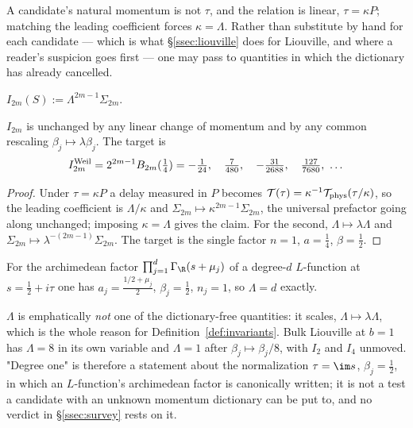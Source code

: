 A candidate's natural momentum is not $\tau$, and the relation is linear,
$\tau=\kappa P$; matching the leading coefficient forces $\kappa=\Lambda$. Rather
than substitute by hand for each candidate --- which is what \S\ref{ssec:liouville}
does for Liouville, and where a reader's suspicion goes first --- one may pass to
quantities in which the dictionary has already cancelled.

\begin{definition}\label{def:invariants}
$I_{2m}(S):=\Lambda^{2m-1}\Sigma_{2m}$.
\end{definition}

\begin{proposition}\label{prop:dictfree}
$I_{2m}$ is unchanged by any linear change of momentum and by any common
rescaling $\beta_j\mapsto\lambda\beta_j$. The target is
\[
 I_{2m}^{\rm Weil}=2^{2m-1}B_{2m}(\tfrac14)
 =-\tfrac1{24},\quad\tfrac7{480},\quad-\tfrac{31}{2688},\quad\tfrac{127}{7680},\ \dots
\]
\end{proposition}

\begin{proof}
Under $\tau=\kappa P$ a delay measured in $P$ becomes
$\mathcal T(\tau)=\kappa^{-1}\mathcal T_{\rm phys}(\tau/\kappa)$, so the leading
coefficient is $\Lambda/\kappa$ and $\Sigma_{2m}\mapsto\kappa^{2m-1}\Sigma_{2m}$,
the universal prefactor going along unchanged; imposing $\kappa=\Lambda$ gives the
claim. For the
second, $\Lambda\mapsto\lambda\Lambda$ and
$\Sigma_{2m}\mapsto\lambda^{-(2m-1)}\Sigma_{2m}$. The target is the single factor
$n=1$, $a=\frac14$, $\beta=\frac12$.
\end{proof}

\begin{corollary}\label{cor:degree}
For the archimedean factor $\prod_{j=1}^d\Gamma_\R(s+\mu_j)$ of a degree-$d$
$L$-function at $s=\frac12+i\tau$ one has $a_j=\frac{1/2+\mu_j}2$,
$\beta_j=\frac12$, $n_j=1$, so $\Lambda=d$ exactly.
\end{corollary}

$\Lambda$ is emphatically \emph{not} one of the dictionary-free quantities: it
scales, $\Lambda\mapsto\lambda\Lambda$, which is the whole reason for
Definition~\ref{def:invariants}. Bulk Liouville at $b=1$ has $\Lambda=8$ in its own
variable and $\Lambda=1$ after $\beta_j\mapsto\beta_j/8$, with $I_2$ and $I_4$
unmoved. "Degree one" is therefore a statement about the normalization
$\tau=\im s$, $\beta_j=\frac12$, in which an $L$-function's archimedean factor is
canonically written; it is not a test a candidate with an unknown momentum
dictionary can be put to, and no verdict in \S\ref{ssec:survey} rests on it.

